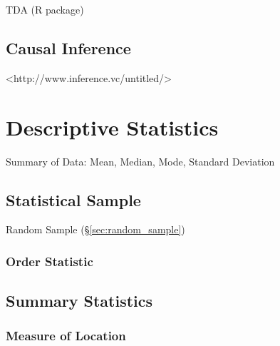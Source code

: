 TDA (R package)



\subsection{Causal Inference}\label{sec:causal_inference}

<http://www.inference.vc/untitled/>



\section{Descriptive Statistics}\label{sec:descriptive_statistics}

Summary of Data: Mean, Median, Mode, Standard Deviation



\subsection{Statistical Sample}\label{sec:statistical_sample}

Random Sample (\S\ref{sec:random_sample})



\subsubsection{Order Statistic}\label{sec:order_statistic}



\subsection{Summary Statistics}\label{sec:summary_statistics}

\subsubsection{Measure of Location}\label{sec:location_measure}

